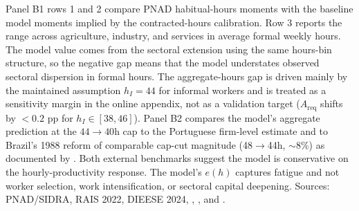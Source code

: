 \begin{table}[htbp]
\begin{minipage}{0.95\textwidth}
{\footnotesize Panel B1 rows 1 and 2 compare PNAD habitual-hours moments with the baseline model moments implied by the contracted-hours calibration. Row 3 reports the range across agriculture, industry, and services in average formal weekly hours. The model value comes from the sectoral extension using the same hours-bin structure, so the negative gap means that the model understates observed sectoral dispersion in formal hours. The aggregate-hours gap is driven mainly by the maintained assumption $h_I=44$ for informal workers and is treated as a sensitivity margin in the online appendix, not as a validation target ($A_{\text{req}}$ shifts by $<0.2$ pp for $h_I\in[38,46]$). Panel B2 compares the model's aggregate prediction at the $44\to 40$h cap to the Portuguese firm-level estimate \citep{AsaiLopesTondini2024} and to Brazil's 1988 reform of comparable cap-cut magnitude (48$\to$44h, $\sim$8\%) as documented by \citet{GonzagaMenezesFilhoCamargo2003}. Both external benchmarks suggest the model is conservative on the hourly-productivity response. The model's $e(h)$ captures fatigue and not worker selection, work intensification, or sectoral capital deepening. Sources: PNAD/SIDRA, RAIS 2022, DIEESE 2024, \citet{MeghirNaritaRobin2015}, \citet{AsaiLopesTondini2024}, and \citet{GonzagaMenezesFilhoCamargo2003} \citep{PNAD2025,RAIS2022,DIEESE2024}.}
\end{minipage}
\end{table}
